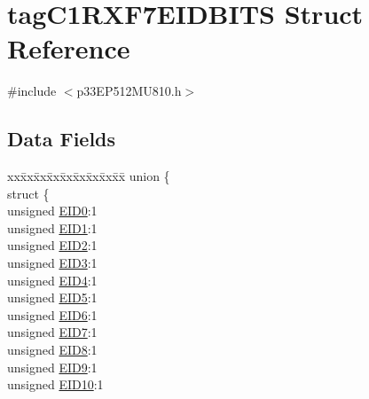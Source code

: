 \hypertarget{structtag_c1_r_x_f7_e_i_d_b_i_t_s}{}\section{tag\+C1\+R\+X\+F7\+E\+I\+D\+B\+I\+TS Struct Reference}
\label{structtag_c1_r_x_f7_e_i_d_b_i_t_s}


{\ttfamily \#include $<$p33\+E\+P512\+M\+U810.\+h$>$}

\subsection*{Data Fields}
\begin{DoxyCompactItemize}
\item 
\begin{tabbing}
xx\=xx\=xx\=xx\=xx\=xx\=xx\=xx\=xx\=\kill
union \{\\
\>struct \{\\
\>\>unsigned \hyperlink{structtag_c1_r_x_f7_e_i_d_b_i_t_s_a9da8b7b30247e4f9cd8cc056549aa9fd}{EID0}:1\\
\>\>unsigned \hyperlink{structtag_c1_r_x_f7_e_i_d_b_i_t_s_afd6c139491d147c1262f3d051c6691e9}{EID1}:1\\
\>\>unsigned \hyperlink{structtag_c1_r_x_f7_e_i_d_b_i_t_s_a36ec62d8d3c5acd5d15e6691dc099a94}{EID2}:1\\
\>\>unsigned \hyperlink{structtag_c1_r_x_f7_e_i_d_b_i_t_s_ab895f7d0ac289a0383b607cbc62eebe2}{EID3}:1\\
\>\>unsigned \hyperlink{structtag_c1_r_x_f7_e_i_d_b_i_t_s_a136d5a709d6618d40acceccb43036656}{EID4}:1\\
\>\>unsigned \hyperlink{structtag_c1_r_x_f7_e_i_d_b_i_t_s_a8dffb2d86a6c184df505ae7c71a58710}{EID5}:1\\
\>\>unsigned \hyperlink{structtag_c1_r_x_f7_e_i_d_b_i_t_s_af8a8574102515d8f1a4b7fd1685d0532}{EID6}:1\\
\>\>unsigned \hyperlink{structtag_c1_r_x_f7_e_i_d_b_i_t_s_a84c3262e67f8d5fd387ac10bde6fa9b1}{EID7}:1\\
\>\>unsigned \hyperlink{structtag_c1_r_x_f7_e_i_d_b_i_t_s_acca25e0b7d86eb499d01f85222baea87}{EID8}:1\\
\>\>unsigned \hyperlink{structtag_c1_r_x_f7_e_i_d_b_i_t_s_ac6748f73d4ada8538b06548be4f396c2}{EID9}:1\\
\>\>unsigned \hyperlink{structtag_c1_r_x_f7_e_i_d_b_i_t_s_a9cea8e77ecbb72bd3b08102412793725}{EID10}:1\\

\end{tabbing}
\end{DoxyCompactItemize}
